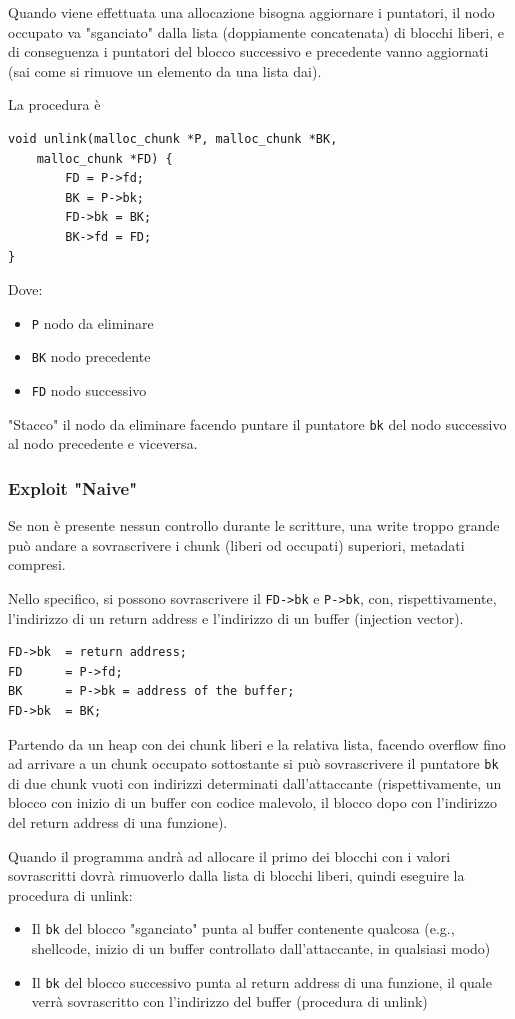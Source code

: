 Quando viene effettuata una allocazione bisogna aggiornare i puntatori, il nodo occupato va "sganciato" dalla lista (doppiamente concatenata) di blocchi liberi, e di conseguenza i puntatori del blocco successivo e precedente vanno aggiornati (sai come si rimuove un elemento da una lista dai).

La procedura è
\begin{verbatim}
void unlink(malloc_chunk *P, malloc_chunk *BK, 
    malloc_chunk *FD) {
        FD = P->fd;
        BK = P->bk;
        FD->bk = BK;
        BK->fd = FD;
}
\end{verbatim}

Dove: 
\begin{itemize}
	\item \texttt{P} nodo da eliminare
    
	\item \texttt{BK} nodo precedente
	
    \item \texttt{FD} nodo successivo 
\end{itemize}

"Stacco" il nodo da eliminare facendo puntare il puntatore \texttt{bk} del nodo successivo al nodo precedente e viceversa.

\subsubsection{Exploit "Naive"}

Se non è presente nessun controllo durante le scritture, una write troppo grande può andare a sovrascrivere i chunk (liberi od occupati) superiori, metadati compresi.

Nello specifico, si possono sovrascrivere il \texttt{FD->bk} e \texttt{P->bk}, con, rispettivamente, l'indirizzo di un return address e l'indirizzo di un buffer (injection vector).
\begin{verbatim}
FD->bk  = return address;
FD      = P->fd;
BK      = P->bk = address of the buffer;
FD->bk  = BK;
\end{verbatim}

Partendo da un heap con dei chunk liberi e la relativa lista, facendo overflow fino ad arrivare a un chunk occupato sottostante si può sovrascrivere il puntatore \texttt{bk} di due chunk vuoti con indirizzi determinati dall'attaccante (rispettivamente, un blocco con inizio di un buffer con codice malevolo, il blocco dopo con l'indirizzo del return address di una funzione).

Quando il programma andrà ad allocare il primo dei blocchi con i valori sovrascritti dovrà rimuoverlo dalla lista di blocchi liberi, quindi eseguire la procedura di unlink: 
\begin{itemize}
    \item Il \texttt{bk} del blocco "sganciato" punta al buffer contenente qualcosa (e.g., shellcode, inizio di un buffer controllato dall'attaccante, in qualsiasi modo)
    
    \item Il \texttt{bk} del blocco successivo punta al return address di una funzione, il quale verrà sovrascritto con l'indirizzo del buffer (procedura di unlink)
\end{itemize}

